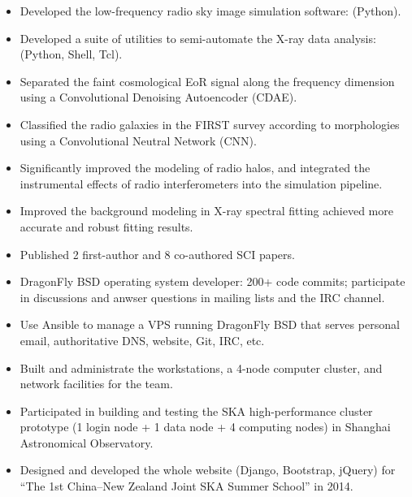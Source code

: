 \documentclass{resume}
\begin{document}
\begin{itemize}
  \item Developed the low-frequency radio sky image simulation software:
    (Python).
  \item Developed a suite of utilities to semi-automate the
    X-ray data analysis:
    (Python, Shell, Tcl).
  \item Separated the faint cosmological EoR signal along the frequency
    dimension using a Convolutional Denoising Autoencoder (CDAE).
  \item Classified the radio galaxies in the FIRST survey according to
    morphologies using a Convolutional Neutral Network (CNN).
  \item Significantly improved the modeling of radio halos,
    and integrated the instrumental effects of radio interferometers
    into the simulation pipeline.
  \item Improved the background modeling in X-ray spectral fitting
    achieved more accurate and robust fitting results.
  \item Published 2 first-author and 8 co-authored SCI papers.
\end{itemize}

\begin{itemize}
  \item DragonFly BSD operating system developer:
    200+ code commits;
    participate in discussions and anwser questions
    in mailing lists and the IRC channel.
  \item Use Ansible to manage a VPS running DragonFly BSD that serves
    personal email, authoritative DNS, website, Git, IRC, etc.
  \item Built and administrate the workstations, a 4-node computer cluster,
    and network facilities for the team.
  \item Participated in building and testing the SKA high-performance
    cluster prototype (1 login node + 1 data node + 4 computing nodes)
    in Shanghai Astronomical Observatory.
  \item Designed and developed the whole website (Django, Bootstrap, jQuery)
    for \enquote{The 1st China--New Zealand Joint SKA Summer School}
    in 2014.
\end{itemize}
\end{document}
